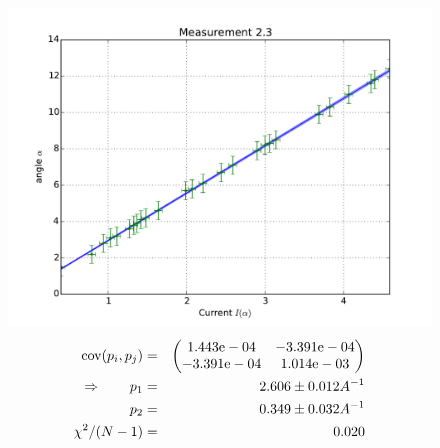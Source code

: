 \begin{figure}
    \begin{centering}
        \includegraphics[width=18cm]{figures/fig23}
\captionsetup{singlelinecheck=off} 
\caption[.]{
\begin{eqnarray*}
    \mathrm{cov}(p_i, p_j) &=& 
    \begin{pmatrix}
        1.443\mathrm{e}-04 &-3.391\mathrm{e}-04 \\
        -3.391\mathrm{e}-04 &1.014\mathrm{e}-03 \\
    \end{pmatrix}
\\ \Rightarrow \qquad
    p_1 &=& 2.606 \pm 0.012 A^{-1}\\
    p_2 &=& 0.349 \pm 0.032 A^{-1} \\
    \chi ^2/(N-1) &=&  0.020
\end{eqnarray*}
}
\label{fig:23}
    \end{centering}
\end{figure}

